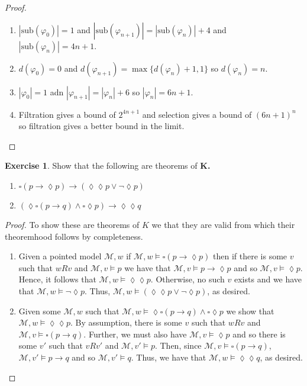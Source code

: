 \documentclass{article}
\newcommand{\vp}{\varphi}
\newcommand{\cM}{\mathcal{M}}
\newcommand{\sub}{\text{sub}}
\theoremstyle{definition}
\newtheorem{exercise}{Exercise}
\begin{document}
\begin{proof} \mbox{}
    \begin{enumerate}[label = (\alph*)]
        \item $|\sub(\vp_0)| = 1$ and $|\sub(\vp_{n+1})| = |\sub(\vp_n)|+4$ and $|\sub(\vp_n)| = 4n+1$. 
        \item $d(\vp_0)=0$ and $d(\vp_{n+1}) = \max\{d(\vp_n)+1, 1\}$ so $d(\vp_n)=n$. 
        \item $|\vp_0| = 1$ adn $|\vp_{n+1}| = |\vp_n| + 6$ so $|\vp_n| = 6n+1$. 
        \item Filtration gives a bound of $2^{4n+1}$ and selection gives a bound of $(6n+1)^n$ so filtration gives a better bound in the limit. 
    \end{enumerate}
\end{proof}

\begin{exercise}
    Show that the following are theorems of \bf{K}. 
    \begin{enumerate}
        \item $\square(p \to \lozenge p) \to (\lozenge \lozenge p \vee \neg \lozenge p)$ 
        \item $(\lozenge \square(p \to q) \wedge \square \lozenge p) \to \lozenge \lozenge q$
    \end{enumerate}
\end{exercise}

\begin{proof} To show these are theorems of $K$ we that they are valid from which their theoremhood follows by completeness. 
    \begin{enumerate}[label = (\alph*)]
        \item Given a pointed model $\cM, w$ if $\cM, w \models \square(p \to \lozenge p)$ then if there is some $v$ such that $wRv$ and $\cM, v \models p$ we have that $\cM, v \models p \to \lozenge p$ and so $\cM, v \models \lozenge p$. Hence, it follows that $\cM, w \models \lozenge \lozenge p$. Otherwise, no such $v$ exists and we have that $\cM, w \models \neg \lozenge p$. Thus, $\cM, w \models (\lozenge \lozenge p \vee \neg \lozenge p)$, as desired. 
        \item Given some $\cM, w$ such that $\cM,w \models \lozenge \square (p \to q) \wedge \square \lozenge p$ we show that $\cM, w \models \lozenge \lozenge p$. By assumption, there is some $v$ such that $w Rv$ and $\cM, v \models \square (p \to q)$. Further, we must also have $\cM, v \models \lozenge p$ and so there is some $v'$ such that $v R v'$ and $\cM, v' \models p$. Then, since $\cM, v \models \square(p \to q)$, $\cM, v' \models p \to q$ and so $\cM, v' \models q$. Thus, we have that $\cM, w \models \lozenge \lozenge q$, as desired. 
     \end{enumerate}
\end{proof}
\end{document}
